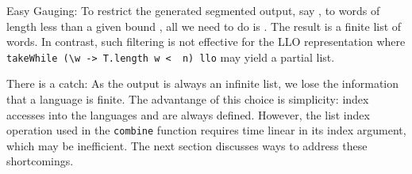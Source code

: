 Easy Gauging: To restrict the generated segmented output, say , to words of
length less than a given 
bound , all we need to do is . The result is
a finite list of words. In contrast, such filtering is not effective
for the LLO representation where
\lstinline{takeWhile (\w -> T.length w <  n) llo} may yield a partial list.


There is a catch: As the output is always an infinite list, we lose the
information that a language is finite. The advantange of this choice is simplicity: index
accesses into the languages  and  are always defined. 
However, the list index operation used in the \lstinline{combine} function requires time
linear in its index argument, which may be inefficient.  
The next section discusses ways to address these shortcomings.

